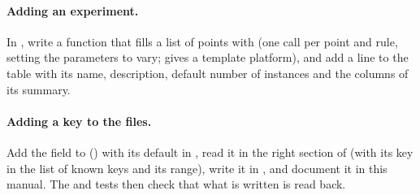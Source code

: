 \paragraph{Adding an experiment.} In , write a
function that fills a list of points with  (one call per
point and rule, setting the parameters to vary; 
gives a template platform), and add a line to the 
table with its name, description, default number of instances and the
columns of its summary.

\paragraph{Adding a key to the files.} Add the field to  () with its default in ,
read it in the right section of  (with its key in the list of
known keys and its range), write it in ,
and document it in this manual. The  and 
tests then check that what is written is read back.
